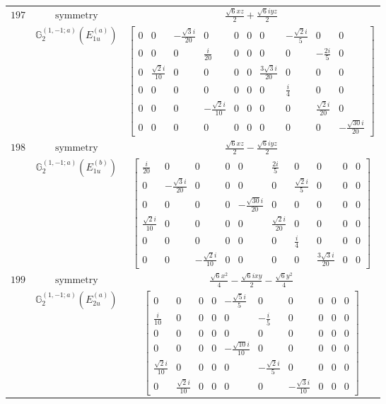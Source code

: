 \documentclass[fleqn,8pt,landscape]{jsarticle}
\begin{document}
\begin{longtable}{ccc}
$ 197 $ & $ \text{symmetry} $ & $ \frac{\sqrt{6} x z}{2} + \frac{\sqrt{6} i y z}{2} $ \\
$  $ & $ \mathbb{G}_{2}^{(1,-1;a)}(E_{1u}^{(a)}) $ & $ \begin{bmatrix} 0 & 0 & - \frac{\sqrt{3} i}{20} & 0 & 0 & 0 & 0 & - \frac{\sqrt{2} i}{5} & 0 & 0 \\ 0 & 0 & 0 & \frac{i}{20} & 0 & 0 & 0 & 0 & - \frac{2 i}{5} & 0 \\ 0 & \frac{\sqrt{2} i}{10} & 0 & 0 & 0 & 0 & \frac{3 \sqrt{3} i}{20} & 0 & 0 & 0 \\ 0 & 0 & 0 & 0 & 0 & 0 & 0 & \frac{i}{4} & 0 & 0 \\ 0 & 0 & 0 & - \frac{\sqrt{2} i}{10} & 0 & 0 & 0 & 0 & \frac{\sqrt{2} i}{20} & 0 \\ 0 & 0 & 0 & 0 & 0 & 0 & 0 & 0 & 0 & - \frac{\sqrt{30} i}{20} \end{bmatrix} $ \\ \hline
$ 198 $ & $ \text{symmetry} $ & $ \frac{\sqrt{6} x z}{2} - \frac{\sqrt{6} i y z}{2} $ \\
$  $ & $ \mathbb{G}_{2}^{(1,-1;a)}(E_{1u}^{(b)}) $ & $ \begin{bmatrix} \frac{i}{20} & 0 & 0 & 0 & 0 & \frac{2 i}{5} & 0 & 0 & 0 & 0 \\ 0 & - \frac{\sqrt{3} i}{20} & 0 & 0 & 0 & 0 & \frac{\sqrt{2} i}{5} & 0 & 0 & 0 \\ 0 & 0 & 0 & 0 & - \frac{\sqrt{30} i}{20} & 0 & 0 & 0 & 0 & 0 \\ \frac{\sqrt{2} i}{10} & 0 & 0 & 0 & 0 & \frac{\sqrt{2} i}{20} & 0 & 0 & 0 & 0 \\ 0 & 0 & 0 & 0 & 0 & 0 & \frac{i}{4} & 0 & 0 & 0 \\ 0 & 0 & - \frac{\sqrt{2} i}{10} & 0 & 0 & 0 & 0 & \frac{3 \sqrt{3} i}{20} & 0 & 0 \end{bmatrix} $ \\ \hline
$ 199 $ & $ \text{symmetry} $ & $ \frac{\sqrt{6} x^{2}}{4} - \frac{\sqrt{6} i x y}{2} - \frac{\sqrt{6} y^{2}}{4} $ \\
$  $ & $ \mathbb{G}_{2}^{(1,-1;a)}(E_{2u}^{(a)}) $ & $ \begin{bmatrix} 0 & 0 & 0 & 0 & - \frac{\sqrt{5} i}{5} & 0 & 0 & 0 & 0 & 0 \\ \frac{i}{10} & 0 & 0 & 0 & 0 & - \frac{i}{5} & 0 & 0 & 0 & 0 \\ 0 & 0 & 0 & 0 & 0 & 0 & 0 & 0 & 0 & 0 \\ 0 & 0 & 0 & 0 & - \frac{\sqrt{10} i}{10} & 0 & 0 & 0 & 0 & 0 \\ \frac{\sqrt{2} i}{10} & 0 & 0 & 0 & 0 & - \frac{\sqrt{2} i}{5} & 0 & 0 & 0 & 0 \\ 0 & \frac{\sqrt{2} i}{10} & 0 & 0 & 0 & 0 & - \frac{\sqrt{3} i}{10} & 0 & 0 & 0 \end{bmatrix} $ \\ \hline

\end{longtable}
\end{document}
